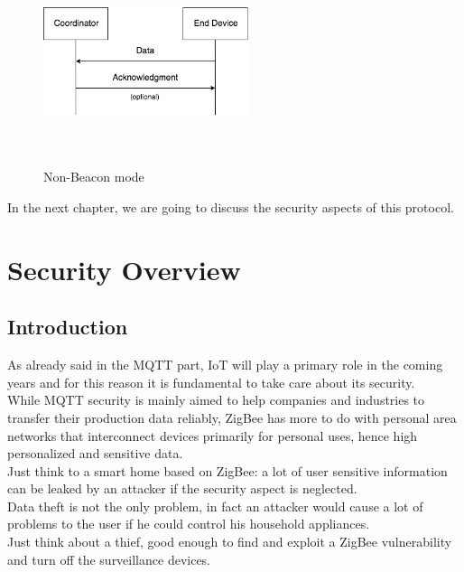 \documentclass[12pt]{report}
\begin{document}
{\begin{itemize}
\begin{figure}[H]
\includegraphics[width=6cm,height=6cm,keepaspectratio]{zigbee_nonbeaconmode}
\centering
\caption{Non-Beacon mode}
\end{figure}

\end{itemize}

In the next chapter, we are going to discuss the security aspects of this protocol.\\

\chapter{Security Overview}

\section{Introduction}
\bigskip
As already said in the MQTT part, IoT will play a primary role in the coming years and for this reason it is fundamental to take care about its security.\\
While MQTT security is mainly aimed to help companies and industries to transfer their production data reliably, ZigBee has more to do with personal area networks that interconnect devices primarily for personal uses, hence high personalized and sensitive data.\\
Just think to a smart home based on ZigBee: a lot of user sensitive information can be leaked by an attacker if the security aspect is neglected.\\
Data theft is not the only problem, in fact an attacker would cause a lot of problems to the user if he could control his household appliances.\\
Just think about a thief, good enough to find and exploit a ZigBee vulnerability and turn off the surveillance devices.\\\\

}
\end{document}
